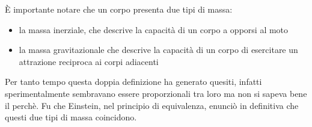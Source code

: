 \documentclass[class=book, crop=false, oneside, 12pt]{standalone}
\begin{document}
È importante notare che un corpo presenta due tipi di massa:
\begin{itemize}
    \item la massa inerziale, che descrive la capacità di un corpo a opporsi al moto
    \item la massa gravitazionale che descrive la capacità di un corpo di esercitare un attrazione reciproca ai corpi adiacenti
\end{itemize}
Per tanto tempo questa doppia definizione ha generato quesiti, infatti sperimentalmente sembravano essere proporzionali tra loro ma non si sapeva bene il perchè.
Fu che Einstein, nel principio di equivalenza, enunciò in definitiva che questi due tipi di massa coincidono.
\end{document}
